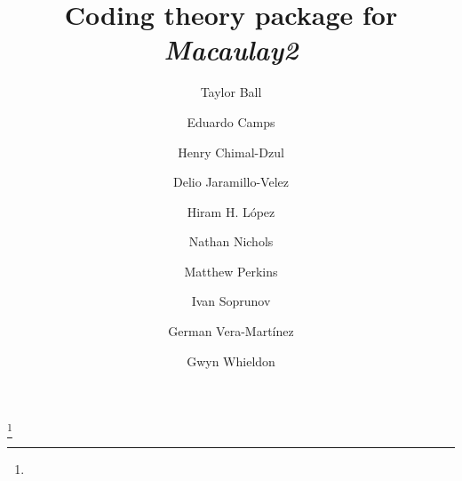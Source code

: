 \documentclass[12pt]{amsart}
\theoremstyle{plain}
\begin{document}
\title{Coding theory package for {\it Macaulay2}}
\author{Taylor Ball}
\address[Taylor Ball]{Department of Mathematics\\University of Notre Dame\\ Notre Dame, IN USA}
\author{Eduardo Camps}
\address[Eduardo Camps]{Escuela Superior de F\'isica y Matem\'aticas \\ Instituto Polit\'ecnico Nacional\\ Mexico City, Mexico}
\author{Henry Chimal-Dzul}
\address[Henry Chimal-Dzul]{Department of Mathematics and Center of Ring Theory and its Applications\\ Ohio University\\ Athens, OH USA}
\author{Delio Jaramillo-Velez}
\address[Delio Jaramillo-Velez]{
Departamento de
Matem\'aticas\\
Centro de Investigaci\'on y de Estudios
Avanzados del
IPN\\
Apartado Postal
14--740 \\
07000 Mexico City, D.F.
}

\author{Hiram H. L\'opez}
\address[Hiram H. L\'opez]{Department of Mathematics and Statistics\\ Cleveland State University\\ Cleveland, OH USA}
\thanks{}
\author{Nathan Nichols}
\address[Nathan Nichols]{School of Mathematics \\ University of Minnesota Twin Cities \\ Minneapolis, MN USA}
\author{Matthew Perkins}
\address[Matthew Perkins]{Department of Mathematics\\ Cleveland State University\\ Cleveland, OH USA}
\author{Ivan Soprunov}
\address[Ivan Soprunov]{Department of Mathematics\\ Cleveland State University\\ Cleveland, OH USA}
\author{German Vera-Mart\'inez}
\address[German Vera-Mart\'inez]{Escuela Superior de F\'isica y Matem\'aticas \\ Instituto Polit\'ecnico Nacional\\ Mexico City, Mexico}
\author{Gwyn Whieldon}
\address[Gwyn Whieldon]{}
\end{document}
